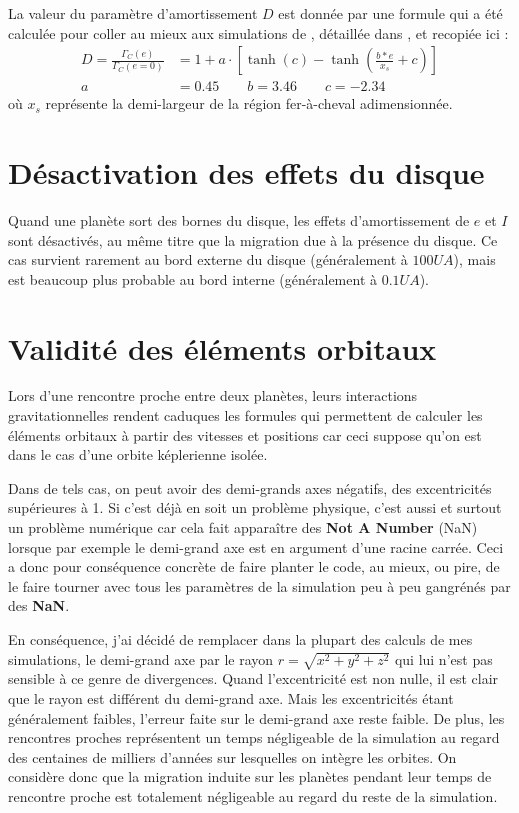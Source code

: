 La valeur du paramètre d'amortissement $D$ est donnée par une formule qui a été calculée pour coller au mieux aux simulations de \cite{bitsch2010orbital}, détaillée dans \cite{cossou2013convergence}, et recopiée ici : 
\begin{subequations}
\begin{align}
D = \frac{\Gamma_C(e)}{\Gamma_C (e=0)} &= 1 + a \cdot \left[\tanh(c) - \tanh\left(\frac{b * e}{x_s}+c\right)\right]\label{eq:eccentricity-influence}\\
a &= 0.45 \qquad b=3.46 \qquad c= -2.34
\end{align}
\end{subequations}
où $x_s$ représente la demi-largeur de la région fer-à-cheval adimensionnée.

\section{Désactivation des effets du disque}
Quand une planète sort des bornes du disque, les effets d'amortissement de $e$ et $I$ sont désactivés, au même titre que la migration due à la présence du disque. Ce cas survient rarement au bord externe du disque (généralement à $100\unit{UA}$), mais est beaucoup plus probable au bord interne (généralement à $0.1\unit{UA}$).

\section{Validité des éléments orbitaux}
Lors d'une rencontre proche entre deux planètes, leurs interactions gravitationnelles rendent caduques les formules qui permettent de calculer les éléments orbitaux à partir des vitesses et positions car ceci suppose qu'on est dans le cas d'une orbite képlerienne isolée. 

Dans de tels cas, on peut avoir des demi-grands axes négatifs, des excentricités supérieures à 1. Si c'est déjà en soit un problème physique, c'est aussi et surtout un problème numérique car cela fait apparaître des \textbf{Not A Number} (NaN) lorsque par exemple le demi-grand axe est en argument d'une racine carrée. Ceci a donc pour conséquence concrète de faire planter le code, au mieux, ou pire, de le faire tourner avec tous les paramètres de la simulation peu à peu gangrénés par des \textbf{NaN}. 

En conséquence, j'ai décidé de remplacer dans la plupart des calculs de mes simulations, le demi-grand axe par le rayon $r=\sqrt{x^2+y^2+z^2}$ qui lui n'est pas sensible à ce genre de divergences. Quand l'excentricité est non nulle, il est clair que le rayon est différent du demi-grand axe. Mais les excentricités étant généralement faibles, l'erreur faite sur le demi-grand axe reste faible. De plus, les rencontres proches représentent un temps négligeable de la simulation au regard des centaines de milliers d'années sur lesquelles on intègre les orbites. On considère donc que la migration induite sur les planètes pendant leur temps de rencontre proche est totalement négligeable au regard du reste de la simulation.
